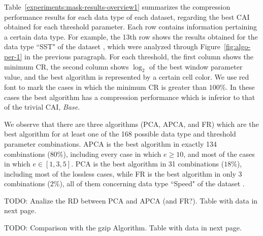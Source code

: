 \clearpage
{}
\clearpage


Table~\ref{experiments:mask-results-overview1} summarizes the compression performance results for each data type of each dataset, regarding the best CAI obtained for each threshold parameter. Each row contains information pertaining a certain data type. For example, the 13th row shows the results obtained for the data type ``SST" of the dataset \datasetelnino, which were analyzed through Figure~\ref{fig:algo-per-1} in the previous paragraph. For each threshold, the first column shows the minimum CR, the second column shows $\log_2$ of the best window parameter value, and the best algorithm is represented by a certain cell color. We use red font to mark the cases in which the minimum CR is greater than $100\%$. In these cases the best algorithm has a compression performance which is inferior to that of the trivial CAI, \textit{Base}.


We observe that there are three algorithms (PCA, APCA, and FR) which are the best algorithm for at least one of the 168 possible data type and threshold parameter combinations. APCA is the best algorithm in exactly 134 combinations ($80\%$), including every case in which $e \geq 10$, and most of the cases in which $e \in [1, 3, 5]$. PCA is the best algorithm in 31 combinations ($18\%$), including most of the lossless cases, while FR is the best algorithm in only 3 combinations ($2\%$), all of them concerning data type ``Speed" of the dataset \datasetwind.





\clearpage

TODO: Analize the RD between PCA and APCA (and FR?). Table with data in next page.
% 
% 
\clearpage

\clearpage

TODO: Comparison with the gzip Algorithm. Table with data in next page.

\clearpage


